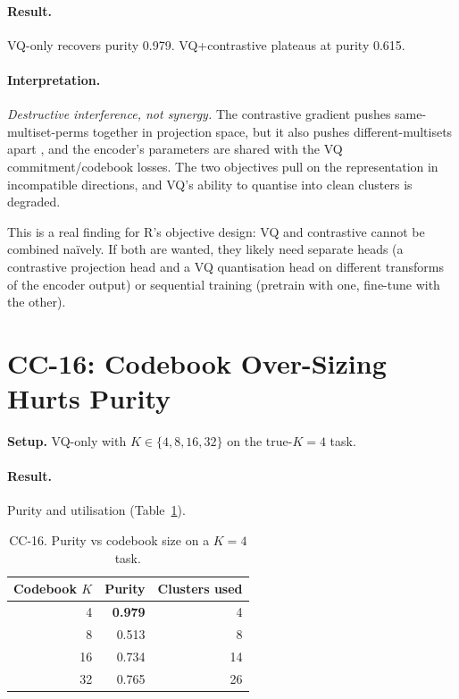\documentclass[10pt, twocolumn, a4paper]{article}
\begin{document}
\paragraph{Result.} VQ-only recovers purity 0.979. VQ+contrastive plateaus at purity 0.615.

\paragraph{Interpretation.} \emph{Destructive interference, not synergy.} The contrastive gradient pushes same-multiset-perms together in projection space, but it also pushes different-multisets apart ,  and the encoder's parameters are shared with the VQ commitment/codebook losses. The two objectives pull on the representation in incompatible directions, and VQ's ability to quantise into clean clusters is degraded.

This is a real finding for R's objective design: VQ and contrastive cannot be combined naïvely. If both are wanted, they likely need separate heads (a contrastive projection head and a VQ quantisation head on different transforms of the encoder output) or sequential training (pretrain with one, fine-tune with the other).

\section{CC-16: Codebook Over-Sizing Hurts Purity}

\textbf{Setup.} VQ-only with $K \in \{4, 8, 16, 32\}$ on the true-$K = 4$ task.

\paragraph{Result.} Purity and utilisation (Table~\ref{tab:cc16}).

\begin{table}[t]
\centering\small
\caption{CC-16. Purity vs codebook size on a $K=4$ task.}
\label{tab:cc16}
\begin{tabular}{rrr}
\toprule
Codebook $K$ & Purity & Clusters used \\
\midrule
4  & \textbf{0.979} & 4 \\
8  & 0.513 & 8 \\
16 & 0.734 & 14 \\
32 & 0.765 & 26 \\
\bottomrule
\end{tabular}
\end{table}
\end{document}
